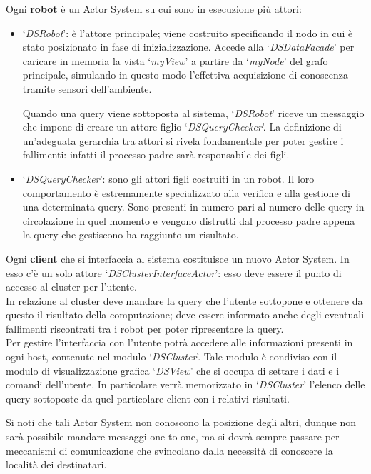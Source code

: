 Ogni \textbf{robot} è un Actor System su cui sono in esecuzione più attori:
\begin{itemize}
\item `\emph{DSRobot}': è l'attore principale; viene costruito specificando
  il nodo in cui è stato posizionato in fase di inizializzazione.
  Accede alla `\emph{DSDataFacade}' per caricare in memoria la vista
  `\emph{myView}' a partire da `\emph{myNode}'
  del grafo principale, simulando in questo modo l'effettiva
  acquisizione di conoscenza tramite sensori dell'ambiente.

  Quando una query viene sottoposta al sistema, `\emph{DSRobot}' riceve
  un messaggio che impone di creare un attore figlio
  `\emph{DSQueryChecker}'.
  La definizione di un'adeguata gerarchia tra attori si rivela fondamentale
  per poter gestire i fallimenti: infatti il processo padre sarà
  responsabile dei figli.
\item `\emph{DSQueryChecker}': sono gli attori figli costruiti in un
  robot. Il loro comportamento è estremamente specializzato alla
  verifica e alla gestione di una determinata query. Sono presenti in numero pari
  al numero delle query in circolazione in quel momento e vengono
  distrutti dal processo padre appena la query che gestiscono ha raggiunto
  un risultato.
\end{itemize}

Ogni \textbf{client} che si interfaccia al sistema costituisce un nuovo Actor System.
In esso c'è un solo attore `\emph{DSClusterInterfaceActor}':
esso deve essere il punto di accesso al cluster per l'utente.\\
In relazione al cluster deve mandare la query che l'utente
sottopone e ottenere da questo il risultato della computazione;
deve essere informato anche degli eventuali fallimenti
riscontrati tra i robot per poter ripresentare la query.\\
Per gestire l'interfaccia con l'utente potrà accedere alle informazioni
presenti in ogni host, contenute nel modulo `\emph{DSCluster}'.
Tale modulo è condiviso con il modulo di visualizzazione grafica
`\emph{DSView}' che si occupa di settare i dati e i comandi dell'utente.
In particolare verrà memorizzato in `\emph{DSCluster}' l'elenco delle
query sottoposte da quel particolare client con i relativi
risultati.

Si noti che tali Actor System non conoscono la posizione degli altri,
dunque non sarà possibile mandare messaggi one-to-one,
ma si dovrà sempre passare per meccanismi di comunicazione che svincolano
dalla necessità di conoscere la località dei destinatari.

